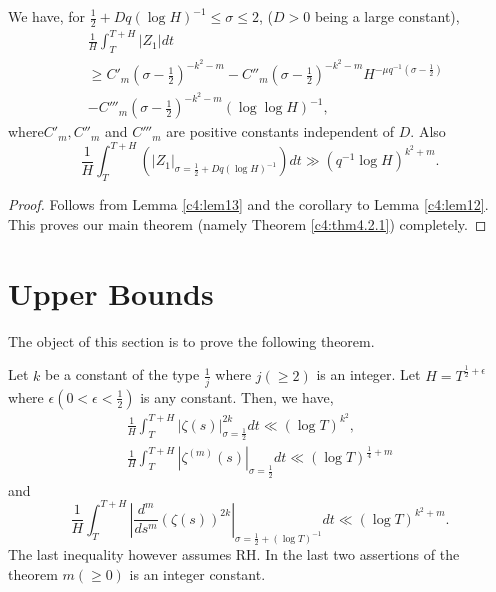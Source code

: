\begin{lem}\label{c4:lem14}
We have, for $\frac{1}{2} + D q(\log H)^{-1} \leq \sigma \leq 2$, ($D > 0$ being a large constant),
\begin{align*}
& \frac{1}{H} \int^{T+H}_T |Z_1| dt \\
& \geq C'_m \left(\sigma -\frac{1}{2} \right)^{-k^2 -m} - C''_m \left(\sigma -\frac{1}{2} \right)^{-k^2 -m } H^{-\mu q^{-1} (\sigma -\frac{1}{2})}\\
& - C'''_m  \left(\sigma -\frac{1}{2} \right)^{-k^2 - m} (\log \log H)^{-1}, 
\end{align*}
where\pageoriginale $C'_m, C''_m$ and $C'''_m$ are positive constants independent of $D$. Also
$$
\frac{1}{H} \int^{T+H}_T (|Z_1|_{\sigma = \frac{1}{2} + D q (\log H)^{-1}}) dt \gg (q^{-1} \log H)^{k^2 + m}. 
$$
\end{lem}

\begin{proof}
Follows from Lemma \ref{c4:lem13} and the corollary to Lemma \ref{c4:lem12}. This proves our main theorem (namely Theorem \ref{c4:thm4.2.1}) completely.
\end{proof}

\section{Upper Bounds}\label{c4:sec4.3}
The object of this section is to prove the following theorem.

\begin{theorem}\label{c4:thm4.3.1}
Let $k$ be a constant of the type $\frac{1}{j}$ where $j(\geq 2)$ is an integer. Let $H = T^{\frac{1}{2} + \epsilon}$ where $\epsilon(0 < \epsilon < \frac{1}{2})$ is any constant. Then, we have, 
\begin{gather*}
\frac{1}{H} \int^{T+H}_T |\zeta(s)|^{2k}_{\sigma = \frac{1}{2}} dt \ll (\log T)^{k^2},  \tag{4.3.1}\label{c4:eq4.3.1}\\
\frac{1}{H} \int^{T+H}_T |\zeta^{(m)} (s)|_{\sigma =\frac{1}{2}} dt \ll (\log T)^{\frac{1}{4} + m}  \tag{4.3.2}\label{c4:eq4.3.2}
\end{gather*}
and
\begin{equation*}
\frac{1}{H} \int^{T+H}_T |\frac{d^m}{ds^m} (\zeta(s))^{2k}|_{\sigma =\frac{1}{2} + (\log T)^{-1}} dt \ll (\log T)^{k^2 + m}.  \tag{4.3.3}\label{c4:eq4.3.3}
\end{equation*}
The last inequality however assumes RH. In the last two assertions of the theorem $m(\geq 0)$ is an integer constant.
\end{theorem}


